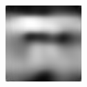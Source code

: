 \begin{figure}[H]
\begin{subfigure}[t]{0.13\textwidth}
  \end{subfigure}
  \begin{subfigure}[t]{0.13\textwidth}
    \centering
    \includegraphics[width=\linewidth]{img/one-trial/intermediate-cnnv4/prediction_0.png}
  \end{subfigure}
  \\
    \vspace{0.1cm}
  

\end{figure}
